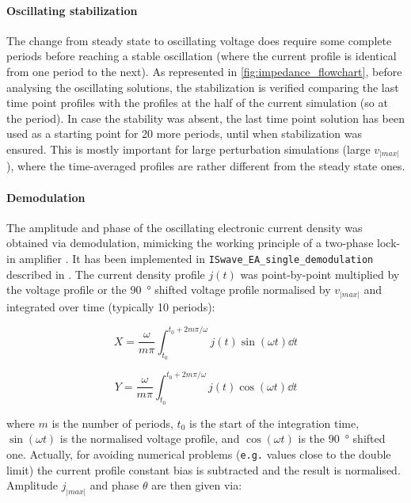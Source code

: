 \paragraph{Oscillating stabilization}
The change from steady state to oscillating voltage does require some complete periods before reaching a stable oscillation (where the current profile is identical from one period to the next).
As represented in \cref{fig:impedance_flowchart}, before analysing the oscillating solutions, the stabilization is verified comparing the last time point profiles with the profiles at the half of the current simulation (so at the  period).
In case the stability was absent, the last time point solution has been used as a starting point for 20 more periods, until when stabilization was ensured.
This is mostly important for large perturbation simulations (large $v_|max|$), where the time\hyp{}averaged profiles are rather different from the steady state ones.

\paragraph{Demodulation}
The amplitude and phase of the oscillating electronic current density was obtained via
demodulation, mimicking the working principle of a two-phase lock-in amplifier \cite{WikipediaLockIn}.
It has been implemented in \texttt{ISwave\_EA\_single\_demodulation} described in .
The current
density profile $j(t)$ was point-by-point multiplied by the voltage profile or the \SI{90}{\degree} shifted
voltage profile normalised by $v_|max|$ and integrated over time (typically 10 periods):

\begin{equation}
X = \frac{\omega}{m \pi} \int_{t_0}^{t_0+2m\pi / \omega} j(t) \sin(\omega t) \dd t
\end{equation}

\begin{equation}
Y = \frac{\omega}{m \pi} \int_{t_0}^{t_0+2m\pi / \omega} j(t) \cos(\omega t) \dd t
\end{equation}

where $m$ is the number of periods, $t_0$ is the start of the integration time, $\sin(\omega t)$ is the normalised voltage profile, and $\cos(\omega t)$ is the \SI{90}{\degree} shifted one.
Actually, for avoiding numerical problems (\texttt{e.g.} values close to the double limit) the current profile constant bias is subtracted and the result is normalised.
Amplitude $j_|max|$ and
phase $\theta$ are then given via:


